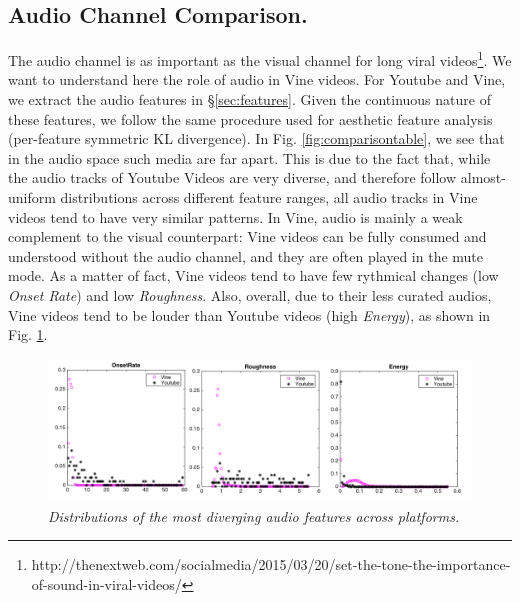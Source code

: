 \subsection{Audio Channel Comparison.} 

The audio channel is as important as the visual channel for long viral videos\footnote{http://thenextweb.com/socialmedia/2015/03/20/set-the-tone-the-importance-of-sound-in-viral-videos/}. We want to understand here the role of audio in  Vine videos. For Youtube and Vine, we extract the audio features in \S\ref{sec:features}. Given the continuous nature of these features, we follow the same procedure used for  aesthetic feature analysis (per-feature symmetric KL divergence). In Fig. \ref{fig:comparisontable}, we see that in the audio space such media are far apart. This is due to the fact that, while the audio tracks of Youtube Videos are very diverse, and therefore follow almost-uniform distributions across different feature ranges, all audio tracks in Vine videos tend to have very similar patterns. In Vine, audio is mainly a weak complement to the visual counterpart: Vine videos can be fully consumed and understood without the audio channel, and they are often played in the mute mode. As a matter of fact, Vine videos tend to have few rythmical changes (low \emph{Onset Rate}) and low \emph{Roughness}. Also, overall, due to their less curated audios, Vine videos tend to be louder than Youtube videos (high \emph{Energy}), as shown in Fig. \ref{fig:comparison_audio}.
\begin{figure}[!htb]
\centering
\includegraphics[width=\columnwidth]{plots/comparison/audio}
\caption{\textsl{ Distributions of the most diverging audio features across platforms.}}
\label{fig:comparison_audio}
\end{figure}

